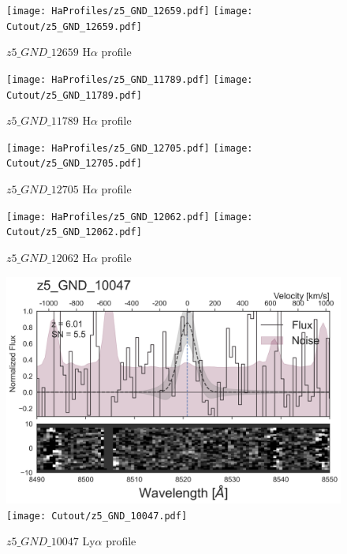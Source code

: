 \documentclass[12pt,english]{article}
\begin{document}
\clearpage
\begin{figure}
\begin{center}\texttt{[image: HaProfiles/z5\_GND\_12659.pdf]}
\texttt{[image: Cutout/z5\_GND\_12659.pdf]}
\caption{$z5\_GND\_12659$ H$\alpha$ profile}
\end{center}
\end{figure}
\clearpage
\begin{figure}
\begin{center}\texttt{[image: HaProfiles/z5\_GND\_11789.pdf]}
\texttt{[image: Cutout/z5\_GND\_11789.pdf]}
\caption{$z5\_GND\_11789$ H$\alpha$ profile}
\end{center}
\end{figure}
\clearpage
\begin{figure}
\begin{center}\texttt{[image: HaProfiles/z5\_GND\_12705.pdf]}
\texttt{[image: Cutout/z5\_GND\_12705.pdf]}
\caption{$z5\_GND\_12705$ H$\alpha$ profile}
\end{center}
\end{figure}
\clearpage
\begin{figure}
\begin{center}\texttt{[image: HaProfiles/z5\_GND\_12062.pdf]}
\texttt{[image: Cutout/z5\_GND\_12062.pdf]}
\caption{$z5\_GND\_12062$ H$\alpha$ profile}
\end{center}
\end{figure}
\clearpage
\begin{figure}
\begin{center}\includegraphics[width=12cm, trim=0.1cm 0cm 0cm -1cm]{LyaProfiles/z5_GND_10047.png}
\texttt{[image: Cutout/z5\_GND\_10047.pdf]}
\caption{$z5\_GND\_10047$ Ly$\alpha$ profile}
\end{center}
\end{figure}
\end{document}
